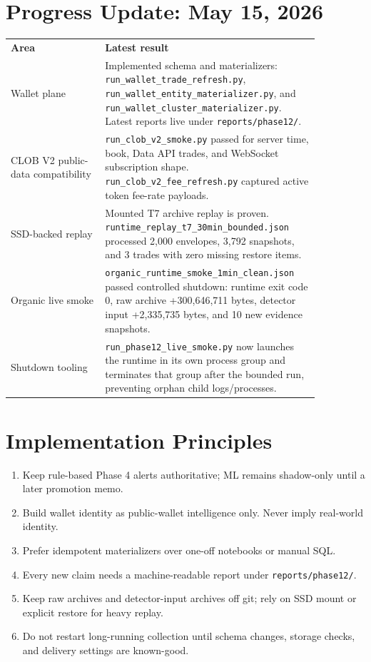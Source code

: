 \documentclass{article}
\begin{document}
\section*{Progress Update: May 15, 2026}
\begin{longtable}{p{0.28\linewidth}p{0.58\linewidth}}
\textbf{Area} & \textbf{Latest result} \\
Wallet plane & Implemented schema and materializers: \texttt{run\_wallet\_trade\_refresh.py}, \texttt{run\_wallet\_entity\_materializer.py}, and \texttt{run\_wallet\_cluster\_materializer.py}. Latest reports live under \texttt{reports/phase12/}. \\
CLOB V2 public-data compatibility & \texttt{run\_clob\_v2\_smoke.py} passed for server time, book, Data API trades, and WebSocket subscription shape. \texttt{run\_clob\_v2\_fee\_refresh.py} captured active token fee-rate payloads. \\
SSD-backed replay & Mounted T7 archive replay is proven. \texttt{runtime\_replay\_t7\_30min\_bounded.json} processed 2{,}000 envelopes, 3{,}792 snapshots, and 3 trades with zero missing restore items. \\
Organic live smoke & \texttt{organic\_runtime\_smoke\_1min\_clean.json} passed controlled shutdown: runtime exit code 0, raw archive +300{,}646{,}711 bytes, detector input +2{,}335{,}735 bytes, and 10 new evidence snapshots. \\
Shutdown tooling & \texttt{run\_phase12\_live\_smoke.py} now launches the runtime in its own process group and terminates that group after the bounded run, preventing orphan child logs/processes. \\
\end{longtable}

\section*{Implementation Principles}
\begin{enumerate}[nosep]
\item Keep rule-based Phase 4 alerts authoritative; ML remains shadow-only until a later promotion memo.
\item Build wallet identity as public-wallet intelligence only. Never imply real-world identity.
\item Prefer idempotent materializers over one-off notebooks or manual SQL.
\item Every new claim needs a machine-readable report under \texttt{reports/phase12/}.
\item Keep raw archives and detector-input archives off git; rely on SSD mount or explicit restore for heavy replay.
\item Do not restart long-running collection until schema changes, storage checks, and delivery settings are known-good.
\end{enumerate}
\end{document}
